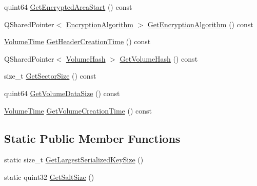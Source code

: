 \begin{DoxyCompactItemize}
\item 
quint64 \hyperlink{class_gost_crypt_1_1_volume_1_1_volume_header_aa84d7ba1968057eead5ecb0a0f691023}{Get\+Encrypted\+Area\+Start} () const
\item 
Q\+Shared\+Pointer$<$ \hyperlink{class_gost_crypt_1_1_volume_1_1_encryption_algorithm}{Encryption\+Algorithm} $>$ \hyperlink{class_gost_crypt_1_1_volume_1_1_volume_header_ac25aa68af3a7b66c139ca4eec42ec44a}{Get\+Encryption\+Algorithm} () const
\item 
\hyperlink{namespace_gost_crypt_1_1_volume_a4aab8aad1263f3abd1e4949b1e428468}{Volume\+Time} \hyperlink{class_gost_crypt_1_1_volume_1_1_volume_header_a0ca388f488857dbe7a7ccd37162c507d}{Get\+Header\+Creation\+Time} () const
\item 
Q\+Shared\+Pointer$<$ \hyperlink{class_gost_crypt_1_1_volume_1_1_volume_hash}{Volume\+Hash} $>$ \hyperlink{class_gost_crypt_1_1_volume_1_1_volume_header_a1fb49b0a5cd673cbd0da51c4d5c9f4ff}{Get\+Volume\+Hash} () const
\item 
size\+\_\+t \hyperlink{class_gost_crypt_1_1_volume_1_1_volume_header_a9b9ebf3b6b0793975b7d77a2f32abf2d}{Get\+Sector\+Size} () const
\item 
quint64 \hyperlink{class_gost_crypt_1_1_volume_1_1_volume_header_afe9b400a865f65e6067a23927842ae7d}{Get\+Volume\+Data\+Size} () const
\item 
\hyperlink{namespace_gost_crypt_1_1_volume_a4aab8aad1263f3abd1e4949b1e428468}{Volume\+Time} \hyperlink{class_gost_crypt_1_1_volume_1_1_volume_header_aececfd078b4fb36e176eed40d6224c19}{Get\+Volume\+Creation\+Time} () const
\end{DoxyCompactItemize}
\subsection*{Static Public Member Functions}
\begin{DoxyCompactItemize}
\item 
static size\+\_\+t \hyperlink{class_gost_crypt_1_1_volume_1_1_volume_header_a1b249cf7187ef90304c1553ca4809160}{Get\+Largest\+Serialized\+Key\+Size} ()
\item 
static quint32 \hyperlink{class_gost_crypt_1_1_volume_1_1_volume_header_a56fa388c0bcbca1fa9216f6fc2592a12}{Get\+Salt\+Size} ()
\end{DoxyCompactItemize}
